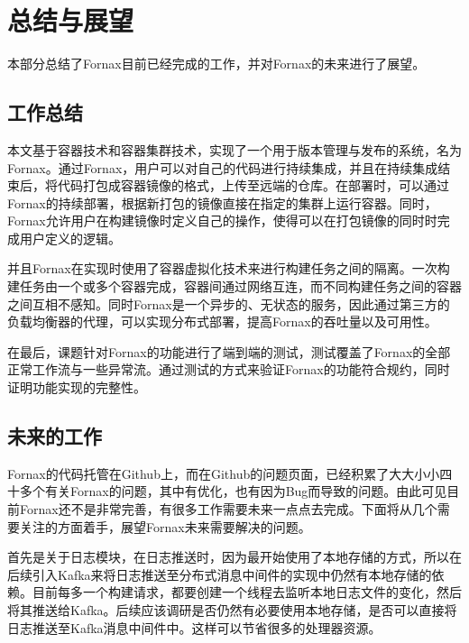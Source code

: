 
\chapter{总结与展望}

本部分总结了Fornax目前已经完成的工作，并对Fornax的未来进行了展望。

\section{工作总结}

本文基于容器技术和容器集群技术，实现了一个用于版本管理与发布的系统，名为Fornax。通过Fornax，用户可以对自己的代码进行持续集成，并且在持续集成结束后，将代码打包成容器镜像的格式，上传至远端的仓库。在部署时，可以通过Fornax的持续部署，根据新打包的镜像直接在指定的集群上运行容器。同时，Fornax允许用户在构建镜像时定义自己的操作，使得可以在打包镜像的同时时完成用户定义的逻辑。

并且Fornax在实现时使用了容器虚拟化技术来进行构建任务之间的隔离。一次构建任务由一个或多个容器完成，容器间通过网络互连，而不同构建任务之间的容器之间互相不感知。同时Fornax是一个异步的、无状态的服务，因此通过第三方的负载均衡器的代理，可以实现分布式部署，提高Fornax的吞吐量以及可用性。

在最后，课题针对Fornax的功能进行了端到端的测试，测试覆盖了Fornax的全部正常工作流与一些异常流。通过测试的方式来验证Fornax的功能符合规约，同时证明功能实现的完整性。

\section{未来的工作}

Fornax的代码托管在Github上，而在Github的问题页面，已经积累了大大小小四十多个有关Fornax的问题，其中有优化，也有因为Bug而导致的问题。由此可见目前Fornax还不是非常完善，有很多工作需要未来一点点去完成。下面将从几个需要关注的方面着手，展望Fornax未来需要解决的问题。

首先是关于日志模块，在日志推送时，因为最开始使用了本地存储的方式，所以在后续引入Kafka来将日志推送至分布式消息中间件的实现中仍然有本地存储的依赖。目前每多一个构建请求，都要创建一个线程去监听本地日志文件的变化，然后将其推送给Kafka。后续应该调研是否仍然有必要使用本地存储，是否可以直接将日志推送至Kafka消息中间件中。这样可以节省很多的处理器资源。

